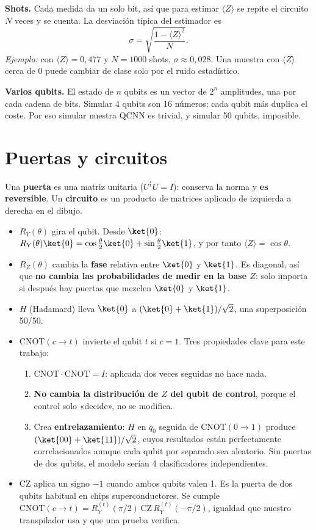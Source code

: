 \documentclass[11pt,a4paper]{article}
\begin{document}
\textbf{Shots.} Cada medida da un solo bit, así que para estimar $\langle Z\rangle$ se repite el circuito $N$ veces y se
cuenta. La desviación típica del estimador es
\[
  \sigma = \sqrt{\frac{1 - \langle Z\rangle^2}{N}} .
\]
\emph{Ejemplo:} con $\langle Z\rangle = 0{,}477$ y $N = 1000$ shots, $\sigma \approx 0{,}028$. Una muestra con
$\langle Z\rangle$ cerca de 0 puede cambiar de clase solo por el ruido estadístico.

\textbf{Varios qubits.} El estado de $n$ qubits es un vector de $2^n$ amplitudes, una por cada cadena de bits. Simular
4 qubits son 16 números; cada qubit más duplica el coste. Por eso simular nuestra QCNN es trivial, y simular 50 qubits,
imposible.

\section{Puertas y circuitos}

Una \textbf{puerta} es una matriz unitaria ($U^\dagger U = I$): conserva la norma y \textbf{es reversible}. Un
\textbf{circuito} es un producto de matrices aplicado de izquierda a derecha en el dibujo.

\begin{itemize}
  \item $R_Y(\theta)$ gira el qubit. Desde $\ket{0}$:
        $R_Y(\theta)\ket{0} = \cos\tfrac{\theta}{2}\ket{0} + \sin\tfrac{\theta}{2}\ket{1}$, y por tanto
        $\langle Z\rangle = \cos\theta$.
  \item $R_Z(\theta)$ cambia la \textbf{fase} relativa entre $\ket{0}$ y $\ket{1}$. Es diagonal, así que \textbf{no
        cambia las probabilidades de medir en la base $Z$}: solo importa si después hay puertas que mezclen
        $\ket{0}$ y $\ket{1}$.
  \item $H$ (Hadamard) lleva $\ket{0}$ a $(\ket{0} + \ket{1})/\sqrt{2}$, una superposición 50/50.
  \item $\mathrm{CNOT}(c \to t)$ invierte el qubit $t$ si $c = 1$. Tres propiedades clave para este trabajo:
  \begin{enumerate}
    \item $\mathrm{CNOT}\cdot\mathrm{CNOT} = I$: aplicada dos veces seguidas no hace nada.
    \item \textbf{No cambia la distribución de $Z$ del qubit de control}, porque el control solo «decide», no se modifica.
    \item Crea \textbf{entrelazamiento}: $H$ en $q_0$ seguida de $\mathrm{CNOT}(0\to1)$ produce
          $(\ket{00} + \ket{11})/\sqrt{2}$, cuyos resultados están perfectamente correlacionados aunque cada qubit por
          separado sea aleatorio. Sin puertas de dos qubits, el modelo serían 4 clasificadores independientes.
  \end{enumerate}
  \item $\mathrm{CZ}$ aplica un signo $-1$ cuando ambos qubits valen 1. Es la puerta de dos qubits habitual en chips
        superconductores. Se cumple
        $\mathrm{CNOT}(c\to t) = R_Y^{(t)}(\pi/2)\,\mathrm{CZ}\,R_Y^{(t)}(-\pi/2)$, igualdad que nuestro
        transpilador usa y que una prueba verifica.
\end{itemize}
\end{document}
